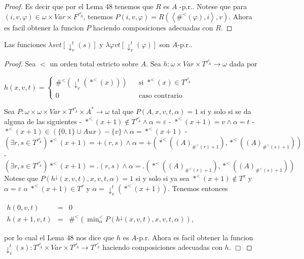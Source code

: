 \begin{proof}
    Es decir que por el Lema 48 tenemos que \(R\) es \(A\) -p.r.. Notese que para \((i,v,\varphi )\in \omega \times Var\times F^{\tau _{A}^{e}}\), tenemos \(P(i,v,\varphi )=R(\left\langle \#^{< }(\varphi ),i\right\rangle ,v)\). Ahora es facil obtener la funcion \(P\) haciendo composiciones adecuadas con \(R\).
  \end{proof}

  \begin{lemma}
    Las funciones \(\lambda svt[\downarrow _{v}^{t}(s)]\) y \(\lambda \varphi vt[\downarrow _{v}^{t}(\varphi )]\) son \(A\)-p.r..
  \end{lemma}
  \begin{proof}
    Sea \(< \) un orden total estricto sobre \(A\). Sea \(h:\omega \times Var\times T^{\tau _{A}^{e}}\rightarrow \omega \) dada por

    \(\displaystyle h(x,v,t)=\left\{ \begin{array}{ccc} \#^{< }(\downarrow _{v}^{t}(\ast ^{< }(x))) & & \text{si }\ast ^{< }(x)\in T^{\tau _{A}^{e}} \\ 0 & & \text{caso contrario} \end{array} \right. \)

    Sea \(P:\omega \times \omega \times Var\times T^{\tau _{A}^{e}}\times A^{\ast }\rightarrow \omega \) tal que \(P(A,x,v,t,\alpha )=1\) si y solo si se da alguna de las siguientes
    - \(\ast ^{< }(x+1)\notin T^{\tau _{A}^{e}}\wedge \alpha =\varepsilon \)
    - \(\ast ^{< }(x+1)=v\wedge \alpha =t\)
    - \(\ast ^{< }(x+1)\in (\{0,1\}\cup Aux)-\{v\}\wedge \alpha =\ast ^{< }(x+1)\)
    - \((\exists r,s\in T^{\tau _{A}^{e}})\ast ^{< }(x+1)=+(r,s)\wedge \alpha =+(\ast ^{< }((A)_{\#^{< }(r)+1}),\ast ^{< }((A)_{\#^{< }(s)+1}))\)
    - \((\exists r,s\in T^{\tau _{A}^{e}})\ast ^{< }(x+1)=\mathrm{.} (r,s)\wedge \alpha =\mathrm{.}(\ast ^{< }((A)_{\#^{< }(r)+1}),\ast ^{< }((A)_{\#^{< }(s)+1}))\)
    Notese que \(P(h^{\downarrow }(x,v,t),x,v,t,\alpha )=1\) si y solo si ya sea \(\ast ^{< }(x+1)\notin T^{\tau }\) y \(\alpha =\varepsilon \) o \(\ast ^{< }(x+1)\in T^{\tau }\) y \(\alpha =\mathrm{\downarrow }_{v}^{t}(\ast ^{< }(x+1))\). Tenemos entonces

    \(\displaystyle \begin{array}{rcl} h(0,v,t) & =& 0 \\ h(x+1,v,t) & =& \#^{< }(\min_{\alpha }^{< }P(h^{\downarrow }(x,v,t),x,v,t,\alpha )), \end{array} \)

    por lo cual el Lema 48 nos dice que \(h\) es \(A\)-p.r. Ahora es facil obtener la funcion \(\downarrow _{v}^{t}(s):T^{\tau _{A}^{e}}\times Var\times T^{\tau _{A}^{e}}\rightarrow T^{\tau _{A}^{e}}\) haciendo composiciones adecuadas con \(h\). \(\Box\)
  \end{proof}

